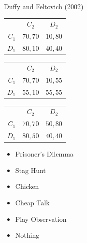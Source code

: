 \documentclass{beamer}
\begin{document}
\begin{frame}{Duffy and Feltovich (2002)}
\begin{card}
\begin{center}
\begin{tabular}{r|c|c|}
				\multicolumn{1}{r}{}& \multicolumn{1}{c}{$C_2$}  & \multicolumn{1}{c}{$D_2$} \\ \cline{2-3}
				$C_1$ &  $70,70$ & $10,80$ \\ \cline{2-3}
				$D_1$ &  $80,10$ & $40,40$ \\ \cline{2-3}
\end{tabular}
\begin{tabular}{r|c|c|}
				\multicolumn{1}{r}{}& \multicolumn{1}{c}{$C_2$}  & \multicolumn{1}{c}{$D_2$} \\ \cline{2-3}
				$C_1$ &  $70,70$ & $10, 55$ \\ \cline{2-3}
				$D_1$ &  $55,10$ & $55,55$ \\ \cline{2-3}
\end{tabular}
\begin{tabular}{r|c|c|}
				\multicolumn{1}{r}{}& \multicolumn{1}{c}{$C_2$}  & \multicolumn{1}{c}{$D_2$} \\ \cline{2-3}
				$C_1$ &  $70,70$ & $50,80$ \\ \cline{2-3}
				$D_1$ &  $80,50$ & $40,40$ \\ \cline{2-3}
\end{tabular}
\end{center}
\end{card}

\end{frame}

\begin{frame}
\begin{card}
		\begin{itemize}
			\item Prisoner's Dilemma
			\item Stag Hunt
			\item Chicken
		\end{itemize}
\end{card}
\begin{card}
		\begin{itemize}
			\item Cheap Talk
			\item Play Observation
			\item Nothing
		\end{itemize}
\end{card}
\end{frame}
\end{document}
